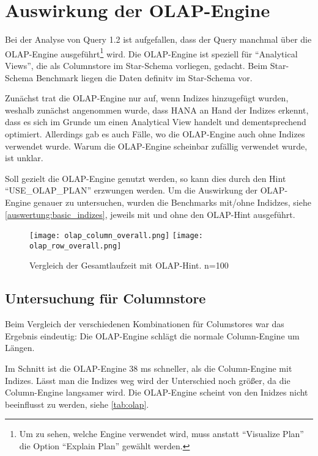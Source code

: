 \section{Auswirkung der OLAP-Engine}\label{auswertung:olap}
Bei der Analyse von Query 1.2 ist aufgefallen, dass der Query manchmal über die OLAP-Engine 
ausgeführt\footnote{Um zu sehen, welche Engine verwendet wird, muss anstatt \enquote{Visualize Plan} die Option \enquote{Explain Plan} gewählt werden.} wird. 
Die OLAP-Engine ist speziell für \enquote{Analytical Views}, die als Columnstore im Star-Schema vorliegen, gedacht.\cite{olap,olap2} Beim Star-Schema Benchmark liegen die Daten definitv im Star-Schema vor.


Zunächst trat die OLAP-Engine nur auf, wenn Indizes hinzugefügt wurden, weshalb zunächst angenommen wurde, dass
 HANA an Hand der Indizes erkennt, dass es sich im Grunde um einen Analytical View handelt und dementsprechend optimiert.
Allerdings gab es auch Fälle, wo die OLAP-Engine auch ohne Indizes verwendet wurde. Warum die OLAP-Engine scheinbar zufällig verwendet wurde, ist unklar.

Soll gezielt die OLAP-Engine genutzt werden, so kann dies durch den Hint \enquote{USE\_OLAP\_PLAN} erzwungen werden.\cite{olap3,olap5}
Um die Auswirkung der OLAP-Engine genauer zu untersuchen, wurden die Benchmarks mit/ohne Indidzes, siehe \autoref{auswertung:basic_indizes}, jeweils mit und ohne den OLAP-Hint ausgeführt.


\begin{figure}[H]
    \centering
    \texttt{[image: olap\_column\_overall.png]}
    \texttt{[image: olap\_row\_overall.png]}
    \caption{Vergleich der Gesamtlaufzeit mit OLAP-Hint. n=100}
	\label{fig:olap_overall}
\end{figure}

\subsection{Untersuchung für Columnstore}
Beim Vergleich der verschiedenen Kombinationen für Columstores war das Ergebnis eindeutig: Die OLAP-Engine schlägt die normale Column-Engine um Längen.

Im Schnitt ist die OLAP-Engine 38 ms schneller, als die Column-Engine mit Indizes. Lässt man die Indizes weg wird der Unterschied noch größer, da die Column-Engine langsamer wird.
 Die OLAP-Engine scheint von den Inidzes nicht beeinflusst zu werden, siehe \autoref{tab:olap}.

